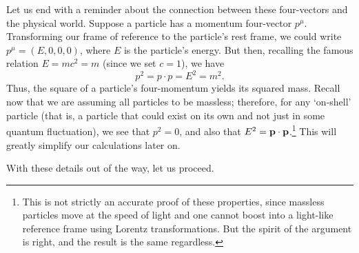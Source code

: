 \documentclass[../thesis.tex]{subfiles}
\begin{document}
	Let us end with a reminder about the connection between these four-vectors and the physical world. Suppose a particle has a momentum four-vector $p^\mu$. Transforming our frame of reference to the particle's rest frame, we could write $p^\mu = (E, 0, 0, 0)$, where $E$ is the particle's energy. But then, recalling the famous relation $E = mc^2 = m$ (since we set $c = 1$), we have
	\begin{equation}
		p^2 = p \cdot p = E^2 = m^2.
	\end{equation}
	Thus, the square of a particle's four-momentum yields its squared mass. Recall now that we are assuming all particles to be massless; therefore, for any `on-shell' particle (that is, a particle that could exist on its own and not just in some quantum fluctuation), we see that $p^2 = 0$, and also that $E^2 = \vb{p} \cdot \vb{p}$.\footnote{This is not strictly an accurate proof of these properties, since massless particles move at the speed of light and one cannot boost into a light-like reference frame using Lorentz transformations. But the spirit of the argument is right, and the result is the same regardless.} This will greatly simplify our calculations later on.

	With these details out of the way, let us proceed.

%  
% 
\end{document}
